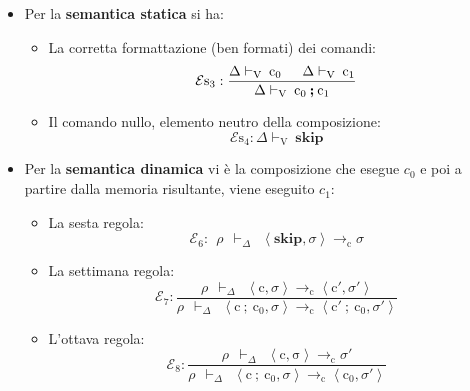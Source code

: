 \documentclass[a4paper]{article}
\begin{document}
 	\begin{itemize}
 		\item Per la \textbf{semantica statica} si ha:
 		\begin{itemize}
 			\item La corretta formattazione (ben formati) dei comandi:
 			\begin{equation*}
 				\mathcal{E}\mathrm{s}_{3} : \dfrac{
 					\Delta\vdash_{\mathrm{V}} \: \mathrm{c}_{0} \hspace{1.5em} \Delta\vdash_{\mathrm{V}} \: \mathrm{c}_{1}
 				}{
 					\Delta\vdash_{\mathrm{V}} \: \mathrm{c}_{0} \: \boldsymbol{;} \: \mathrm{c}_{1}
 				}
 			\end{equation*}
 			
 			\item Il comando nullo, elemento neutro della composizione:
 			\begin{equation*}
 				\mathcal{E}\mathrm{s}_{4} : \Delta\vdash_{\mathrm{V}} \: \mathbf{skip}
 			\end{equation*}
 		\end{itemize}\newpage
 		
 		\item Per la \textbf{semantica dinamica} vi è la composizione che esegue $c_{0}$ e poi a partire dalla memoria risultante, viene eseguito $c_{1}$:
 		\begin{itemize}
 			\item La sesta regola:
 			\begin{equation*}
 				\mathcal{E}_{6} : \:\: \rho \:\: \vdash_{\Delta} \:\: \left\langle \mathbf{skip}, \sigma \right\rangle \rightarrow_{\mathrm{c}} \sigma
 			\end{equation*}
 			
 			\item La settimana regola:
 			\begin{equation*}
 				\mathcal{E}_{7} : \dfrac{
 					\rho \:\: \vdash_{\Delta} \:\: \left\langle \mathrm{c}, \sigma \right\rangle \rightarrow_{\mathrm{c}} \left\langle \mathrm{c}', \sigma' \right\rangle
 				}{
 					\rho \:\: \vdash_{\Delta} \:\: \left\langle \mathrm{c} \: \boldsymbol{;} \: \mathrm{c}_{0}, \sigma \right\rangle \rightarrow_{\mathrm{c}} \left\langle \mathrm{c}' \: \boldsymbol{;} \: \mathrm{c}_{0}, \sigma' \right\rangle
 				}
 			\end{equation*}
 			
 			\item L'ottava regola:
 			\begin{equation*}
 				\mathcal{E}_{8} : \dfrac{
 					\rho \:\: \vdash_{\Delta} \:\: \left\langle \mathrm{c, \sigma} \right\rangle \rightarrow_{\mathrm{c}} \sigma'
 				}{
 					\rho \:\: \vdash_{\Delta} \:\: \left\langle \mathrm{c} \: \boldsymbol{;} \: \mathrm{c}_{0}, \sigma \right\rangle \rightarrow_{\mathrm{c}} \left\langle \mathrm{c}_{0}, \sigma' \right\rangle
 				}
 			\end{equation*}
 		\end{itemize}
 	\end{itemize}
\end{document}
